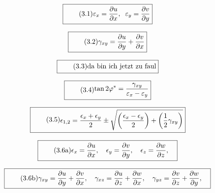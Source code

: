 \documentclass[11pt]{article}
\newcommand{\1}{ {\mathds{1}} }
\begin{document}
\begin{multicols}{2}
		\begin{equation}
			\boxed{
				\tag{3.1}
				\begin{split}
					\varepsilon_x
					=
					\frac{\partial u}{\partial x}, \;\;
					\varepsilon_y
					=
					\frac{\partial v}{\partial y}				 
				\end{split}
			}
		\end{equation}		

		\begin{equation}
			\boxed{
				\tag{3.2}
				\begin{split}
					\gamma_{xy}
					=
					\frac{\partial u}{\partial y}
					+
					\frac{\partial v}{\partial x}
				\end{split}
			}
		\end{equation}		

		\begin{equation}
			\boxed{
				\tag{3.3}
				\begin{split}
					\text{da bin ich jetzt zu faul}
				\end{split}
			}
		\end{equation}		

		\begin{equation}
			\boxed{
				\tag{3.4}
				\begin{split}
					\tan 2\varphi^\ast
					=
					\frac{\gamma_{xy}}{\varepsilon_x -\varepsilon_y}
				\end{split}
			}
		\end{equation}

		\begin{equation}
			\boxed{
				\tag{3.5}
				\begin{split}
					\epsilon_{1,2} = \frac{\epsilon_x + \epsilon_y}{2}
					\pm
					\sqrt{\left( \frac{\epsilon_x - \epsilon_y}{2}\right) + \left( \frac{1}{2} \gamma_{xy} \right) }
				\end{split}
			}
		\end{equation}		

		\begin{equation}
			\boxed{
				\tag{3.6a}
				\begin{split}
					\epsilon_x = \frac{\partial u}{\partial x}, \quad
					\epsilon_y = \frac{\partial v}{\partial y}, \quad
					\epsilon_z = \frac{\partial w}{\partial z}, \quad
				\end{split}
			}
		\end{equation}		

		\begin{equation}
			\boxed{
				\tag{3.6b}
				\begin{split}
					\gamma_{xy} = \frac{\partial u}{\partial y} + \frac{\partial v}{\partial x}, \quad
					\gamma_{xz} = \frac{\partial u}{\partial z} + \frac{\partial w}{\partial x}, \quad
					\gamma_{yz} = \frac{\partial v}{\partial z} + \frac{\partial w}{\partial y}, \quad
				\end{split}
			}
		\end{equation}		


\end{multicols}
\end{document}
